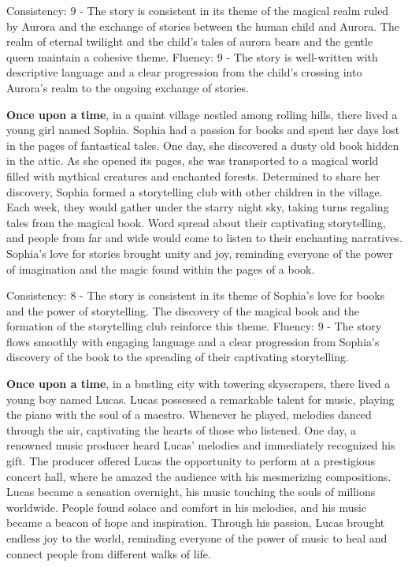 \documentclass{article}
\begin{document}
Consistency: 9 - The story is consistent in its theme of the magical realm ruled by Aurora and the exchange of stories between the human child and Aurora. The realm of eternal twilight and the child's tales of aurora bears and the gentle queen maintain a cohesive theme.
Fluency: 9 - The story is well-written with descriptive language and a clear progression from the child's crossing into Aurora's realm to the ongoing exchange of stories.

\textbf{Once upon a time}, in a quaint village nestled among rolling hills, there lived a young girl named Sophia. Sophia had a passion for books and spent her days lost in the pages of fantastical tales. One day, she discovered a dusty old book hidden in the attic. As she opened its pages, she was transported to a magical world filled with mythical creatures and enchanted forests. Determined to share her discovery, Sophia formed a storytelling club with other children in the village. Each week, they would gather under the starry night sky, taking turns regaling tales from the magical book. Word spread about their captivating storytelling, and people from far and wide would come to listen to their enchanting narratives. Sophia's love for stories brought unity and joy, reminding everyone of the power of imagination and the magic found within the pages of a book.

Consistency: 8 - The story is consistent in its theme of Sophia's love for books and the power of storytelling. The discovery of the magical book and the formation of the storytelling club reinforce this theme.
Fluency: 9 - The story flows smoothly with engaging language and a clear progression from Sophia's discovery of the book to the spreading of their captivating storytelling.

\textbf{Once upon a time}, in a bustling city with towering skyscrapers, there lived a young boy named Lucas. Lucas possessed a remarkable talent for music, playing the piano with the soul of a maestro. Whenever he played, melodies danced through the air, captivating the hearts of those who listened. One day, a renowned music producer heard Lucas' melodies and immediately recognized his gift. The producer offered Lucas the opportunity to perform at a prestigious concert hall, where he amazed the audience with his mesmerizing compositions. Lucas became a sensation overnight, his music touching the souls of millions worldwide. People found solace and comfort in his melodies, and his music became a beacon of hope and inspiration. Through his passion, Lucas brought endless joy to the world, reminding everyone of the power of music to heal and connect people from different walks of life.
\end{document}
